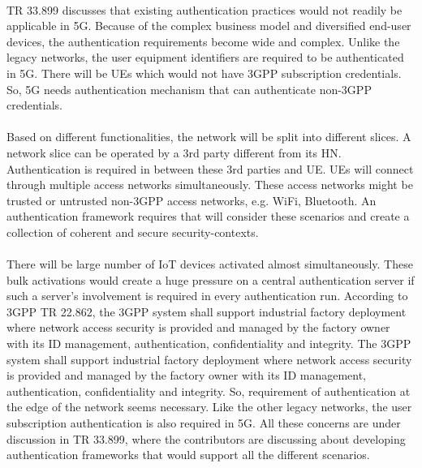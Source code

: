 \documentclass[12pt]{llncs}
\begin{document}
\paragraph{}
TR 33.899 discusses that existing authentication practices would not readily be applicable in 5G. Because of the complex business model and diversified end-user devices, the authentication requirements become wide and complex. Unlike the legacy networks, the user equipment identifiers are required to be authenticated in 5G. There will be UEs which would not have 3GPP subscription credentials. So, 5G needs authentication mechanism that can authenticate non-3GPP credentials. 
\paragraph{}
Based on different functionalities, the network will be split into different slices. A network slice can be operated by a 3rd party different from its HN. Authentication is required in between these 3rd parties and UE. UEs will connect through multiple access networks simultaneously. These access networks might be trusted or untrusted non-3GPP access networks, e.g. WiFi, Bluetooth. An authentication framework requires that will consider these scenarios and create a collection of coherent and secure security-contexts.
\paragraph{}
There will be large number of IoT devices activated almost simultaneously. These bulk activations would create a huge pressure on a central authentication server if such a server's involvement is required in every authentication run. According to 3GPP TR 22.862, the 3GPP system shall support industrial factory deployment where network access security is provided and managed by the factory owner with its ID management, authentication, confidentiality and integrity. The 3GPP system shall support industrial factory deployment where network access security is provided and managed
by the factory owner with its ID management, authentication, confidentiality and integrity. So, requirement of authentication at the edge of the network seems necessary. Like the other legacy networks, the user subscription authentication is also required in 5G. All these concerns are under discussion in TR 33.899, where the contributors are discussing about developing authentication frameworks that would support all the different scenarios. 
\end{document}
